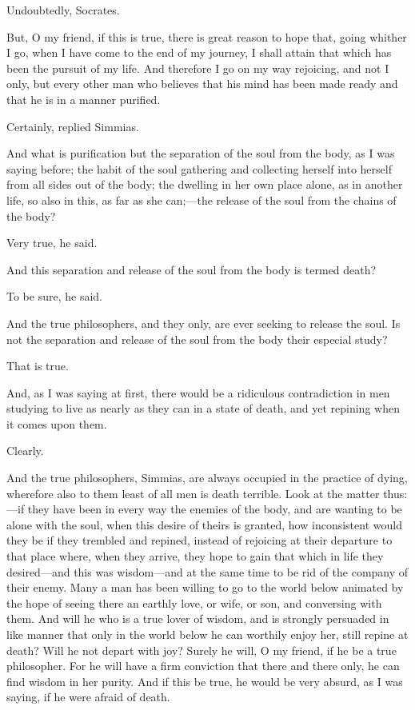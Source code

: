 Undoubtedly, Socrates.

But, O my friend, if this is true, there is great reason to hope that,
going whither I go, when I have come to the end of my journey, I shall
attain that which has been the pursuit of my life. And therefore I go on
my way rejoicing, and not I only, but every other man who believes that
his mind has been made ready and that he is in a manner purified.

Certainly, replied Simmias.

And what is purification but the separation of the soul from the body, as
I was saying before; the habit of the soul gathering and collecting
herself into herself from all sides out of the body; the dwelling in her
own place alone, as in another life, so also in this, as far as she can;—the
release of the soul from the chains of the body?

Very true, he said.

And this separation and release of the soul from the body is termed death?

To be sure, he said.

And the true philosophers, and they only, are ever seeking to release the
soul. Is not the separation and release of the soul from the body their
especial study?

That is true.

And, as I was saying at first, there would be a ridiculous contradiction
in men studying to live as nearly as they can in a state of death, and yet
repining when it comes upon them.

Clearly.

And the true philosophers, Simmias, are always occupied in the practice of
dying, wherefore also to them least of all men is death terrible. Look at
the matter thus:—if they have been in every way the enemies of the
body, and are wanting to be alone with the soul, when this desire of
theirs is granted, how inconsistent would they be if they trembled and
repined, instead of rejoicing at their departure to that place where, when
they arrive, they hope to gain that which in life they desired—and
this was wisdom—and at the same time to be rid of the company of
their enemy. Many a man has been willing to go to the world below animated
by the hope of seeing there an earthly love, or wife, or son, and
conversing with them. And will he who is a true lover of wisdom, and is
strongly persuaded in like manner that only in the world below he can
worthily enjoy her, still repine at death? Will he not depart with joy?
Surely he will, O my friend, if he be a true philosopher. For he will have
a firm conviction that there and there only, he can find wisdom in her
purity. And if this be true, he would be very absurd, as I was saying, if
he were afraid of death.

